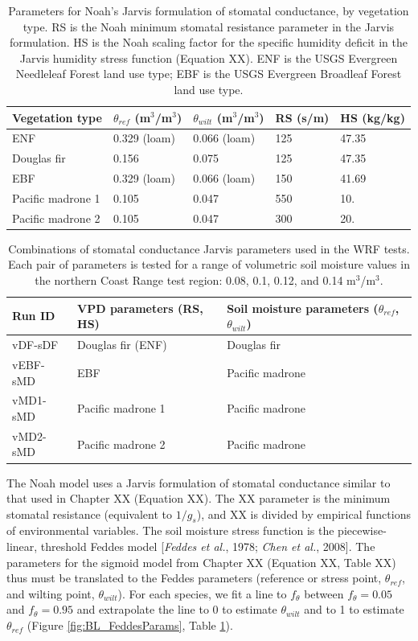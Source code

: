 \begin{table}
\begin{tabular}{ l p{3cm} p{3cm} p{2cm} p{3cm} }
\hline
Vegetation type & $\theta_{ref}$ (m$^3$/m$^3$) & $\theta_{wilt}$ (m$^3$/m$^3$) & RS (s/m) & HS (kg/kg)\\ \hline
ENF & 0.329 (loam) & 0.066 (loam) & 125 & 47.35\\
Douglas fir & 0.156 & 0.075 & 125 & 47.35\\
EBF & 0.329 (loam) & 0.066 (loam) & 150 & 41.69\\
Pacific madrone 1 & 0.105 & 0.047 & 550 & 10.\\
Pacific madrone 2 & 0.105 & 0.047 & 300 & 20.\\
\hline
\end{tabular}
\caption{Parameters for Noah's Jarvis formulation of stomatal conductance, by vegetation type.  RS is the Noah minimum stomatal resistance parameter in the Jarvis formulation. HS is the Noah scaling factor for the specific humidity deficit in the Jarvis humidity stress function (Equation XX). ENF is the USGS Evergreen Needleleaf Forest land use type; EBF is the USGS Evergreen Broadleaf Forest land use type.}
\label{table:BL_NoahJarvisparams}
\end{table}

\begin{table}
\begin{tabular}{ l p{6cm} p{7cm} }
\hline
Run ID & VPD parameters (RS, HS) & Soil moisture parameters ($\theta_{ref}$, $\theta_{wilt}$)\\ \hline
vDF-sDF & Douglas fir (ENF) & Douglas fir\\
vEBF-sMD & EBF & Pacific madrone\\
vMD1-sMD & Pacific madrone 1 & Pacific madrone\\
vMD2-sMD & Pacific madrone 2 & Pacific madrone\\
\hline
\end{tabular}
\caption{Combinations of stomatal conductance Jarvis parameters used in the WRF tests.  Each pair of parameters is tested for a range of volumetric soil moisture values in the northern Coast Range test region: 0.08, 0.1, 0.12, and 0.14 m$^3$/m$^3$.}
\label{table:BL_WRFruns}
\end{table}

The Noah model uses a Jarvis formulation of stomatal conductance similar to that used in Chapter XX (Equation XX).  The XX parameter is the minimum stomatal resistance (equivalent to $1/g_s$), and XX is divided by empirical functions of environmental variables.  The soil moisture stress function is the piecewise-linear, threshold Feddes model [\textit{Feddes et al.}, 1978; \textit{Chen et al.}, 2008].  The parameters for the sigmoid model from Chapter XX (Equation XX, Table XX) thus must be translated to the Feddes parameters (reference or stress point, $\theta_{ref}$, and wilting point, $\theta_{wilt}$).  For each species, we fit a line to $f_{\theta}$ between $f_{\theta}=0.05$ and $f_{\theta}=0.95$ and extrapolate the line to 0 to estimate $\theta_{wilt}$ and to 1 to estimate $\theta_{ref}$ (Figure \ref{fig:BL_FeddesParams}, Table \ref{table:BL_NoahJarvisparams}).


